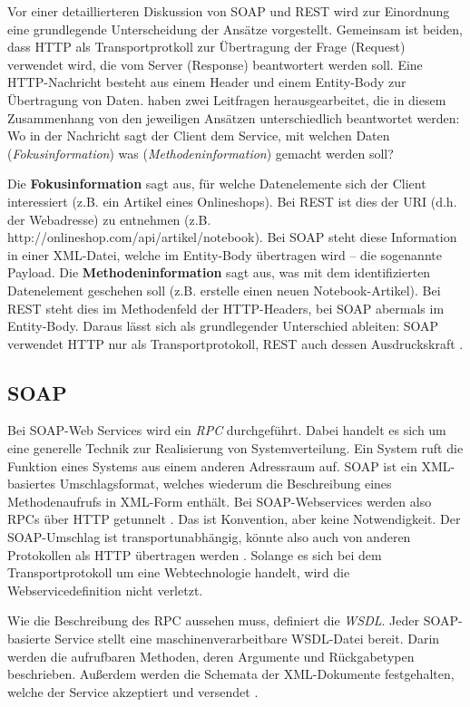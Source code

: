 \documentclass[11pt, a4paper, titlepage, listof=totoc, bibliography=totoc, index=totoc, twoside, openright, headings=normal, draft]{scrreprt}
\begin{document}
Vor einer detaillierteren Diskussion von SOAP und REST wird zur Einordnung eine grundlegende Unterscheidung der Ansätze vorgestellt. Gemeinsam ist beiden, dass HTTP als Transportprotkoll zur Übertragung der Frage (Request) verwendet wird, die vom Server (Response) beantwortert werden soll. Eine HTTP-Nachricht besteht aus einem Header und einem Entity-Body zur Übertragung von Daten. \citet{richardson07} haben zwei Leitfragen herausgearbeitet, die in diesem Zusammenhang von den jeweiligen Ansätzen unterschiedlich beantwortet werden: Wo in der Nachricht sagt der Client dem Service, mit welchen Daten (\emph{Fokusinformation}) was (\emph{Methodeninformation}) gemacht werden soll?

Die \textbf{Fokusinformation} sagt aus, für welche Datenelemente sich der Client interessiert (z.B. ein Artikel eines Onlineshops). Bei REST ist dies der \ac{URI} (d.h. der Webadresse) zu entnehmen (z.B. http://onlineshop.com/api/artikel/notebook). Bei SOAP steht diese Information in einer XML-Datei, welche im Entity-Body übertragen wird -- die sogenannte Payload. Die \textbf{Methodeninformation} sagt aus, was mit dem identifizierten Datenelement geschehen soll (z.B. \glqq erstelle einen neuen Notebook-Artikel\grqq{}). Bei REST steht dies im Methodenfeld der HTTP-Headers, bei SOAP abermals im Entity-Body. Daraus lässt sich als grundlegender Unterschied ableiten: SOAP verwendet HTTP nur als Transportprotokoll, REST auch dessen Ausdruckskraft \citep{wilde11}.

\subsection{SOAP}
Bei SOAP-Web Services wird ein \emph{\ac{RPC}} durchgeführt. Dabei handelt es sich um eine generelle Technik zur Realisierung von Systemverteilung. Ein System ruft die Funktion eines Systems aus einem anderen Adressraum auf. SOAP ist ein XML-basiertes Umschlagsformat, welches wiederum die Beschreibung eines Methodenaufrufs in XML-Form enthält. Bei SOAP-Webservices werden also \ac{RPC}s über HTTP getunnelt \citep{wilde11}. Das ist Konvention, aber keine Notwendigkeit. Der SOAP-Umschlag ist transportunabhängig, könnte also auch von anderen Protokollen als HTTP übertragen werden \citep{tilkov11}. Solange es sich bei dem Transportprotokoll um eine Webtechnologie handelt, wird die Webservicedefinition nicht verletzt.

Wie die Beschreibung des \ac{RPC} aussehen muss, definiert die \emph{\ac{WSDL}}. Jeder SOAP-basierte Service stellt eine maschinenverarbeitbare \ac{WSDL}-Datei bereit. Darin werden die aufrufbaren Methoden, deren Argumente und Rückgabetypen beschrieben. Außerdem werden die Schemata der XML-Dokumente festgehalten, welche der Service akzeptiert und versendet \citep{richardson07}.
\end{document}
